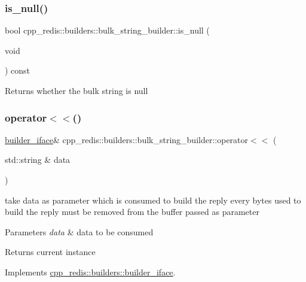 \subsubsection{\texorpdfstring{is\+\_\+null()}{is\_null()}}
{\footnotesize\ttfamily bool cpp\+\_\+redis\+::builders\+::bulk\+\_\+string\+\_\+builder\+::is\+\_\+null (\begin{DoxyParamCaption}\item[{void}]{ }\end{DoxyParamCaption}) const}

\begin{DoxyReturn}{Returns}
whether the bulk string is null 
\end{DoxyReturn}
\mbox{\label{classcpp__redis_1_1builders_1_1bulk__string__builder_a43000357f87212f657aafe279a92b541}} 
\subsubsection{\texorpdfstring{operator$<$$<$()}{operator<<()}}
{\footnotesize\ttfamily \hyperlink{classcpp__redis_1_1builders_1_1builder__iface}{builder\+\_\+iface}\& cpp\+\_\+redis\+::builders\+::bulk\+\_\+string\+\_\+builder\+::operator$<$$<$ (\begin{DoxyParamCaption}\item[{std\+::string \&}]{data }\end{DoxyParamCaption})\hspace{0.3cm}{\ttfamily [virtual]}}

take data as parameter which is consumed to build the reply every bytes used to build the reply must be removed from the buffer passed as parameter


\begin{DoxyParams}{Parameters}
{\em data} & data to be consumed \\
\hline
\end{DoxyParams}
\begin{DoxyReturn}{Returns}
current instance 
\end{DoxyReturn}


Implements \hyperlink{classcpp__redis_1_1builders_1_1builder__iface_a9892bbc9c887c31c2742dad4476e2fa6}{cpp\+\_\+redis\+::builders\+::builder\+\_\+iface}.

